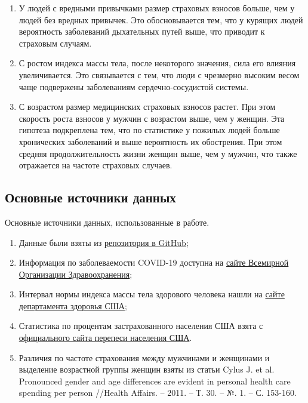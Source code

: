\documentclass[a4paper,12pt]{article}
\begin{document}
\begin{enumerate}
	\item У людей с вредными привычками размер страховых взносов больше, чем у людей без вредных привычек. Это обосновывается тем, что у курящих людей вероятность заболеваний дыхательных путей выше, что приводит к страховым случаям.
	
	\item С ростом индекса массы тела, после некоторого значения, сила его влияния увеличивается. Это связывается с тем, что люди с чрезмерно высоким весом чаще подвержены заболеваниям сердечно-сосудистой системы. 
	
	\item С возрастом размер медицинских страховых взносов растет. При этом скорость роста взносов у мужчин с возрастом выше, чем у женщин. Эта гипотеза подкреплена тем, что по статистике у пожилых людей больше хронических заболеваний и выше вероятность их обострения. При этом средняя продолжительность жизни женщин выше, чем у мужчин, что также отражается на частоте страховых случаев.
\end{enumerate}

\subsection{Основные источники данных}
Основные источники данных, использованные в работе.
\begin{enumerate}
	\item Данные были взяты из \href{https://github.com/stedy/Machine-Learning-with-R-datasets/blob/master/insurance.csv}{репозитория в GitHub};
	\item Информация по заболеваемости COVID-19 доступна на \href{https://covid19.who.int/}{сайте Всемирной Организации Здравоохранения};
	\item Интервал нормы индекса массы тела здорового человека нашли на  \href{https://www.cdc.gov/healthyweight/assessing/bmi/adult_bmi/index.html}{сайте департамента здоровья США};
	\item Статистика по процентам застрахованного населения США взята с \href{https://www.census.gov/library/publications/2019/demo/p60-267.html#:~:text=The%20percentage%20of%20people%20with,in%202017%20(92.1%20percent).}{официального сайта перепеси населения США}.
	\item Различия по частоте страхования между мужчинами и женщинами и выделение возрастной группы женщин взяты из статьи Cylus J. et al. Pronounced gender and age differences are evident in personal health care spending per person //Health Affairs. – 2011. – Т. 30. – №. 1. – С. 153-160.
	
\end{enumerate}
\end{document}
